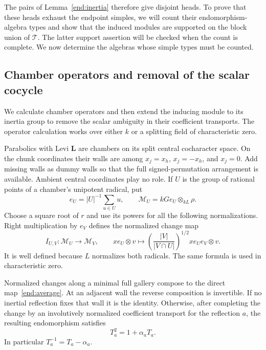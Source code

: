 The pairs of Lemma~\ref{end:inertia} therefore give disjoint heads.
To prove that these heads exhaust the endpoint simples, we will
count their endomorphism-algebra types and show that the induced
modules are supported on the block union of $\mathcal T$.
The latter support assertion will be checked when the count is
complete.  We now determine the algebras whose simple types must
be counted.

\subsection{Chamber operators and removal of the scalar cocycle}

We calculate chamber operators and then extend the inducing module
to its inertia group to remove the scalar ambiguity in their
coefficient transports.  The operator calculation works over
either $k$ or a splitting field of characteristic zero.

Parabolics with Levi $\mathbf L$ are chambers on its split central
cocharacter space.  On the chunk coordinates their walls are among
$x_j=x_h$, $x_j=-x_h$, and $x_j=0$.  Add missing walls as dummy
walls so that the full signed-permutation arrangement is available.
Ambient central coordinates play no role.  If $U$ is the group of
rational points of a chamber's unipotent radical, put
\[
 e_U=|U|^{-1}\sum_{u\in U}u,
 \qquad
 \mathcal M_U=kG e_U\otimes_{kL}\rho.
\]
Choose a square root of $r$ and use its powers for all the following
normalizations.  Right multiplication by $e_V$ defines the
normalized change map
\begin{equation}\label{end:average}
 I_{U,V}:\mathcal M_U\longrightarrow\mathcal M_V,
 \qquad
 x e_U\otimes v\longmapsto
 \left(\frac{|V|}{|V\cap U|}\right)^{1/2}x e_U e_V\otimes v.
\end{equation}
It is well defined because $L$ normalizes both radicals.  The same
formula is used in characteristic zero.

\begin{lemma}\label{end:averaging}
Normalized changes along a minimal full gallery compose to the
direct map~\eqref{end:average}.  At an adjacent wall the reverse
composition is invertible.  If no inertial reflection fixes that
wall it is the identity.  Otherwise, after completing the change
by an involutively normalized coefficient transport for the
reflection $a$, the resulting endomorphism satisfies
\begin{equation}\label{end:quadratic}
 T_a^2=1+\alpha_a T_a.
\end{equation}
In particular $T_a^{-1}=T_a-\alpha_a$.
\end{lemma}

